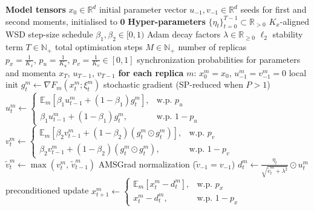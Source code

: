 \documentclass{article}
\begin{document}
\begin{algorithm}[ht]
\caption{FAUST-Adam (probabilistic synchronization formulation)}
\label{alg:desloc_adam_prob}
\begin{algorithmic}[1]
\REQUIRE \textbf{Model tensors}
\STATE $x_0 \in \mathbb{R}^d$ \hfill initial parameter vector
\STATE $u_{-1}, v_{-1} \in \mathbb{R}^d$ \hfill seeds for first and second moments, initialised to $\mathbf{0}$
\REQUIRE \textbf{Hyper-parameters}
\STATE $\{\eta_t\}_{t=0}^{T-1} \subset \mathbb{R}_{>0}$ \hfill $K_x$-aligned WSD step-size schedule
\STATE $\beta_1, \beta_2 \in [0,1)$ \hfill Adam decay factors
\STATE $\lambda \in \mathbb{R}_{\geq 0}$ \hfill $\ell_2$ stability term
\STATE $T \in \mathbb{N}_+$ \hfill total optimisation steps
\STATE $M \in \mathbb{N}_+$ \hfill number of replicas
\STATE $p_x = \frac{1}{K_x},\, p_u = \frac{1}{K_u},\, p_v = \frac{1}{K_v} \in [0,1]$ \hfill synchronization probabilities for parameters and momenta
\ENSURE $x_T$, $u_{T-1}$, $v_{T-1}$
\STATE \textbf{for each replica} $m$: $x_0^m = x_0$, $u_{-1}^m = v_{-1}^m = 0$ \hfill local init
\STATE $g_t^m \leftarrow \nabla F_m(x_t^m; \xi_t^m)$ \hfill stochastic gradient (SP-reduced when $P > 1$)
\STATE $u_t^m \leftarrow \begin{cases} \mathbb{E}_m[\beta_1 u_{t-1}^m + (1-\beta_1) g_t^m], & \text{w.p.\ } p_u \\ \beta_1 u_{t-1}^m + (1-\beta_1) g_t^m, & \text{w.p.\ } 1 - p_u \end{cases}$
\STATE $v_t^m \leftarrow \begin{cases} \mathbb{E}_m[\beta_2 v_{t-1}^m + (1-\beta_2)(g_t^m \odot g_t^m)], & \text{w.p.\ } p_v \\ \beta_2 v_{t-1}^m + (1-\beta_2)(g_t^m \odot g_t^m), & \text{w.p.\ } 1 - p_v \end{cases}$
\STATE $\tilde{v}_t^m \leftarrow \max(v_t^m,\, \tilde{v}_{t-1}^m)$ \hfill AMSGrad normalization ($\tilde{v}_{-1} = v_{-1}$)
\STATE $d_t^m \leftarrow \frac{\eta_t}{\sqrt{\tilde{v}_t^m + \lambda^2}} \odot u_t^m$ \hfill preconditioned update
\STATE $x_{t+1}^m \leftarrow \begin{cases} \mathbb{E}_m[x_t^m - d_t^m], & \text{w.p.\ } p_x \\ x_t^m - d_t^m, & \text{w.p.\ } 1 - p_x \end{cases}$
\ENDFOR
\ENDFOR
\end{algorithmic}
\end{algorithm}
\end{document}
